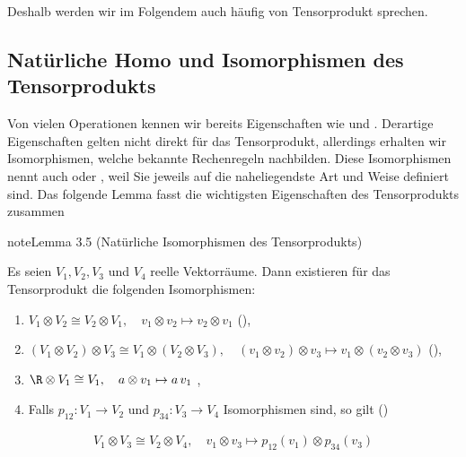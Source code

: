 \documentclass[letterpaper,10pt,english]{jupyterBook}
\begin{document}
\sphinxAtStartPar
Deshalb werden wir im Folgendem auch häufig von  Tensorprodukt sprechen.


\subsection{Natürliche Homo\sphinxhyphen{} und Isomorphismen des Tensorprodukts}
\label{\detokenize{vektoranalysis/tensor:naturliche-homo-und-isomorphismen-des-tensorprodukts}}
\sphinxAtStartPar
Von vielen Operationen kennen wir bereits Eigenschaften wie  und .
Derartige Eigenschaften gelten nicht direkt für das Tensorprodukt, allerdings erhalten wir Isomorphismen, welche bekannte Rechenregeln nachbilden.
Diese Isomorphismen nennt auch  oder , weil Sie jeweils auf die naheliegendste Art und Weise definiert sind.
Das folgende Lemma fasst die wichtigsten Eigenschaften des Tensorprodukts zusammen
\label{vektoranalysis/tensor:lem:natISO}
\begin{sphinxadmonition}{note}{Lemma 3.5 (Natürliche Isomorphismen des Tensorprodukts)}



\sphinxAtStartPar
Es seien \(V_1,V_2,V_3\) und \(V_4\) reelle Vektorräume.
Dann existieren für das Tensorprodukt die folgenden Isomorphismen:
\begin{enumerate}
%
\item {} 
\sphinxAtStartPar
\(V_1\otimes V_2 \cong V_2\otimes V_1, \quad v_1\otimes v_2 \mapsto v_2\otimes v_1\) (),

\item {} 
\sphinxAtStartPar
\((V_1\otimes V_2)\otimes V_3 \cong V_1 \otimes (V_2 \otimes V_3),\quad (v_1\otimes v_2)\otimes v_3 \mapsto v_1 \otimes (v_2\otimes v_3)\) (),

\item {} 
\sphinxAtStartPar
\(\R \otimes V_1 \cong V_1,\quad a\otimes v_1 \mapsto a\,v_1\) ,

\item {} 
\sphinxAtStartPar
Falls \(p_{12}:V_1\to V_2\) und \(p_{34}:V_3\to V_4\) Isomorphismen sind, so gilt ()

\end{enumerate}
\begin{equation*}
\begin{split}V_1\otimes V_3 \cong V_2\otimes V_4,\quad v_1\otimes v_3 \mapsto p_{12}(v_1)\otimes p_{34}(v_3)\end{split}
\end{equation*}\end{sphinxadmonition}
\end{document}

